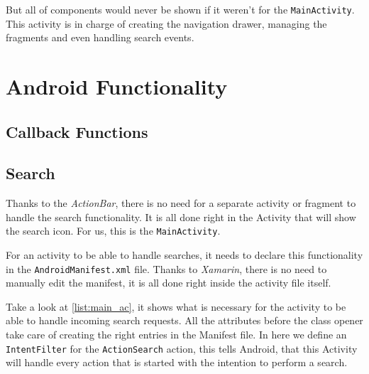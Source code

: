 But all of components would never be shown if it weren't for the \texttt{MainActivity}. This activity is in charge of creating the navigation drawer, managing the fragments and even handling search events.










   





\section{Android Functionality}

\subsection{Callback Functions}\label{callback:and}

\subsection{Search}

Thanks to the \textit{ActionBar}, there is no need for a separate activity or fragment to handle the search functionality. It is all done right in the Activity that will show the search icon. For us, this is the \texttt{MainActivity}.

For an activity to be able to handle searches, it needs to declare this functionality in the \texttt{AndroidManifest.xml} file. Thanks to \textit{Xamarin}, there is no need to manually edit the manifest, it is all done right inside the activity file itself. 

Take a look at \autoref{list:main_ac}, it shows what is necessary for the activity to be able to handle incoming search requests. All the attributes before the class opener take care of creating the right entries in the Manifest file. In here we define an \texttt{IntentFilter} for the \texttt{ActionSearch} action, this tells Android, that this Activity will handle every action that is started with the intention to perform a search.

